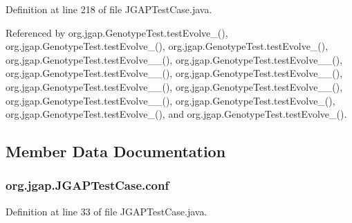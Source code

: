 Definition at line 218 of file J\-G\-A\-P\-Test\-Case.\-java.



Referenced by org.\-jgap.\-Genotype\-Test.\-test\-Evolve\-\_(), org.\-jgap.\-Genotype\-Test.\-test\-Evolve\-\_(), org.\-jgap.\-Genotype\-Test.\-test\-Evolve\-\_(), org.\-jgap.\-Genotype\-Test.\-test\-Evolve\-\_\-\_(), org.\-jgap.\-Genotype\-Test.\-test\-Evolve\-\_\-\_(), org.\-jgap.\-Genotype\-Test.\-test\-Evolve\-\_\-\_(), org.\-jgap.\-Genotype\-Test.\-test\-Evolve\-\_\-\_(), org.\-jgap.\-Genotype\-Test.\-test\-Evolve\-\_\-\_(), org.\-jgap.\-Genotype\-Test.\-test\-Evolve\-\_\-\_(), org.\-jgap.\-Genotype\-Test.\-test\-Evolve\-\_\-\_(), org.\-jgap.\-Genotype\-Test.\-test\-Evolve\-\_(), org.\-jgap.\-Genotype\-Test.\-test\-Evolve\-\_(), and org.\-jgap.\-Genotype\-Test.\-test\-Evolve\-\_().



\subsection{Member Data Documentation}
\hypertarget{classorg_1_1jgap_1_1_j_g_a_p_test_case_a2f976f156a2ab015f30f0828671764e1}{
\subsubsection[{conf}]{ org.\-jgap.\-J\-G\-A\-P\-Test\-Case.\-conf}}\label{classorg_1_1jgap_1_1_j_g_a_p_test_case_a2f976f156a2ab015f30f0828671764e1}


Definition at line 33 of file J\-G\-A\-P\-Test\-Case.\-java.



